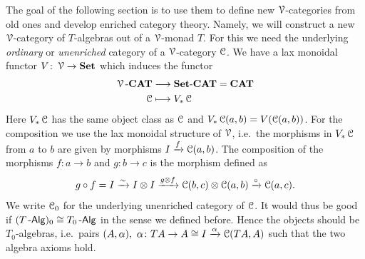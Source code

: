 \documentclass[a4paper,11pt,oneside,openany]{scrbook}
\begin{document}
The goal of the following section is to use them to define new $\V$-categories from old ones and develop enriched category theory. Namely, we will construct a new $\V$-category of $T$-algebras out of a $\V$-monad $T$. For this we need the underlying \emph{ordinary} or \emph{unenriched} category of a $\V$-category $\C$. We have a lax monoidal functor $V\colon\V\to\Set$ which induces the functor
\begin{align*}
    \V\mbox{-}\CAT&\longrightarrow\Set\mbox{-}\CAT=\CAT\\
    \C&\longmapsto V_*\C
\end{align*}
Here $V_*\C$ has the same object class as $\C$ and $V_*\C(a,b)=V(\C(a,b))$. For the composition we use the lax monoidal structure of $\V$, i.e.\ the morphisms in $V_*\C$ from $a$ to $b$ are given by morphisms $I\xrightarrow{f}\C(a,b)$. The composition of the morphisms $f\colon a\to b$ and $g\colon b\to c$ is the morphism defined as
$$g\circ f = I\xrightarrow{\sim} I\otimes I\xrightarrow{g\otimes f}\C(b,c)\otimes\C(a,b)\xrightarrow{\circ}\C(a,c).$$
We write $\C_0$ for the underlying unenriched category of $\C$. It would thus be good if $(T\Alg)_0\cong T_0\Alg$ in the sense we defined before. Hence the objects should be $T_0$-algebras, i.e.\ pairs $(A,\alpha), \ \alpha\colon TA\to A\cong I\xrightarrow{\alpha}\C(TA,A)$ such that the two algebra axioms hold.
\end{document}

